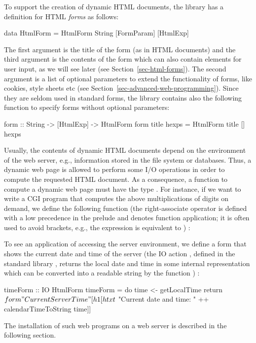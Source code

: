 To support the creation of dynamic HTML documents,
the library 
has a definition for HTML \emph{forms}
as follows:
\begin{curry}
data HtmlForm = HtmlForm String [FormParam] [HtmlExp] 
\end{curry}
The first argument is the title of the form (as in HTML documents)
and the third argument is the contents of the form
which can also contain elements for user input, as
we will see later (see Section~\ref{sec-html-forms}).
The second argument is a list of optional parameters
to extend the functionality of forms, like cookies,
style sheets etc (see Section~\ref{sec-advanced-web-programming}).
Since they are seldom used in standard forms,
the  library contains also the following function
to specify forms without optional parameters:
\begin{curry}
form :: String -> [HtmlExp] -> HtmlForm
form title hexps = HtmlForm title [] hexps
\end{curry}
%
Usually, the contents of dynamic HTML documents depend on the
environment of the web server, e.g., information stored in the
file system or databases. Thus, a dynamic web page is allowed to
perform some I/O operations in order to compute the requested
HTML document. As a consequence, a function to compute
a dynamic web page must have
the type . For instance, if we want to
write a CGI program that computes the above multiplications
of digits on demand, we define the following function 
(the right-associate operator \ccode{\$}\pindex{\$} is
defined with a low precedence
in the prelude and denotes function application; it is often used to avoid
brackets, e.g., the expression  is equivalent to
)
:
To see an application of accessing the server environment,
we define a form that shows the current date and time of the server
(the IO action ,
defined in the standard library , returns the local
date and time in some internal representation which can be
converted into a readable string by the function
)
:
\begin{curry}
timeForm :: IO HtmlForm
timeForm = do
 time <- getLocalTime
 return $ form "Current Server Time"
          [h1 [htxt $ "Current date and time: " ++ calendarTimeToString time]]
\end{curry}
%
The installation of such web programs on a web server is described
in the following section.

